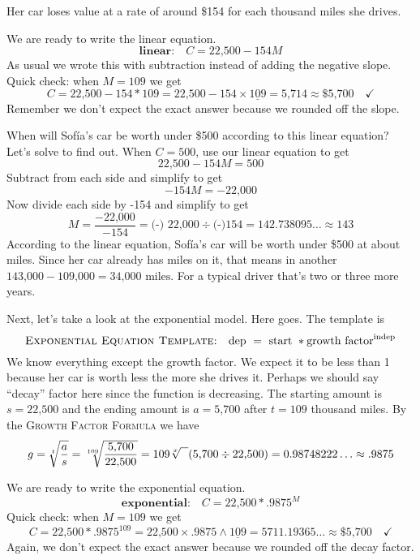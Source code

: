 \noindent
Her car loses value at a rate of around \$154 for each thousand miles she drives.  

We are ready to write the linear equation.  
$$\textbf{linear:} \quad C = \text{22,500} - 154M$$  
As usual we wrote this with subtraction instead of adding the negative slope.  
Quick check:   when $M=109$ we get $$C =  \text{22,500} - 154\ast 109 =  \text{22,500} - 154\times \underline{109}= \text{5,714} \approx \$\text{5,700} \quad \checkmark$$
Remember we don't expect the exact answer because we rounded off the slope.  

When will Sof\'{i}a's car be worth under \$500 according to this linear equation?  Let's solve to find out.  When $C=500$, use our linear equation to get 
$$ \text{22,500} - 154M =500$$
Subtract  from each side and simplify to get
$$-154M= -\text{22,000}$$
 Now divide each side by -154 and simplify to get
$$M = \frac{-\text{22,000}}{-154} = \text{(-) 22,000} \div  \text{(-)}154= 142.738095\ldots \approx 143$$
According to the linear equation, Sof\'{i}a's car will be worth under \$500 at about  miles.  Since her car already has  miles on it, that means in another $\text{143,000}-\text{109,000} = \text{34,000 miles}$.  For a typical driver that's two or three more years.

Next, let's take a look at the exponential model.  Here goes.  The template is $$\textsc{Exponential Equation Template:} \quad \text{dep }=\text{ start } \ast \text{growth factor}^{\text{indep}}$$
We know everything except the growth factor.   We expect it to be less than 1 because her car is worth less the more she drives it.  Perhaps we should say ``decay'' factor here since the function is decreasing. The starting amount is $s=\text{22,500}$ and the ending amount is $a=\text{5,700}$ after $t=109$ thousand miles.  By the  \textsc{Growth Factor Formula} we have
$$g = \sqrt[t]{\frac{a}{s}} = \sqrt[109]{\frac{\text{5,700}}{\text{22,500}}}
= 109  \sqrt[x]{\text{\raisebox{.6em}{~\text{  }}}}( \text{5,700} \div \text{22,500})= 0.98748222\ldots \approx .9875$$

We are ready to write the exponential equation.  
$$\textbf{exponential:} \quad C = \text{22,500} \ast .9875^M$$
Quick check:  when $M=109$ we get $$C =  \text{22,500} \ast .9875^{109} =  \text{22,500} \times .9875 \wedge\underline{109}= 5711.19365\ldots \approx \$\text{5,700} \quad \checkmark$$
Again, we don't expect the exact answer because we rounded off the decay factor.  

